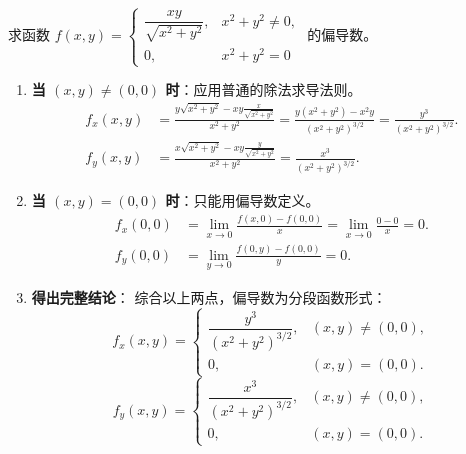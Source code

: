 \documentclass[lang=cn,11pt]{elegantbook}
\begin{document}
\begin{exercise}[分段函数的偏导数]
求函数 $f(x,y) = \begin{cases} \dfrac{xy}{\sqrt{x^2+y^2}}, & x^2+y^2 \neq 0, \\ 0, & x^2+y^2 = 0 \end{cases}$ 的偏导数。
\end{exercise}
\begin{solution}
\begin{enumerate}
  \item \textbf{当 $(x,y) \neq (0,0)$ 时}：应用普通的除法求导法则。
  \begin{align*}
  f_x(x,y) &= \frac{y\sqrt{x^2+y^2} - xy\frac{x}{\sqrt{x^2+y^2}}}{x^2+y^2} = \frac{y(x^2+y^2) - x^2y}{(x^2+y^2)^{3/2}} = \frac{y^3}{(x^2+y^2)^{3/2}}. \\[6pt]
  f_y(x,y) &= \frac{x\sqrt{x^2+y^2} - xy\frac{y}{\sqrt{x^2+y^2}}}{x^2+y^2} = \frac{x^3}{(x^2+y^2)^{3/2}}.
  \end{align*}
  \item \textbf{当 $(x,y) = (0,0)$ 时}：只能用偏导数定义。
  \begin{align*}
  f_x(0,0) &= \lim_{x \to 0} \frac{f(x,0) - f(0,0)}{x} = \lim_{x \to 0} \frac{0 - 0}{x} = 0. \\[6pt]
  f_y(0,0) &= \lim_{y \to 0} \frac{f(0,y) - f(0,0)}{y} = 0.
  \end{align*}
  \item \textbf{得出完整结论}：
  综合以上两点，偏导数为分段函数形式：
  \[
  f_x(x,y) = \begin{cases} \dfrac{y^3}{(x^2+y^2)^{3/2}}, & (x,y) \neq (0,0), \\ 0, & (x,y) = (0,0). \end{cases}
  \]
  \[
  f_y(x,y) = \begin{cases} \dfrac{x^3}{(x^2+y^2)^{3/2}}, & (x,y) \neq (0,0), \\ 0, & (x,y) = (0,0). \end{cases}
  \]
\end{enumerate}
\end{solution}
\end{document}
